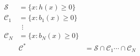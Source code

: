 \documentclass[preview]{standalone}
\begin{document}
\begin{align*}
\mathcal{S} &= \{ x : h(x) \geq 0 \}\\ \mathcal{C}_1 &= \{ x : b_1(x) \geq 0 \}\\ & \ \ \vdots\\  \mathcal{C}_N &= \{ x : b_N(x) \geq 0 \}\\ & \mathcal{C}^* &= \mathcal{S} \cap \mathcal{C}_1 \cdots \cap \mathcal{C}_N
\end{align*}
\end{document}
